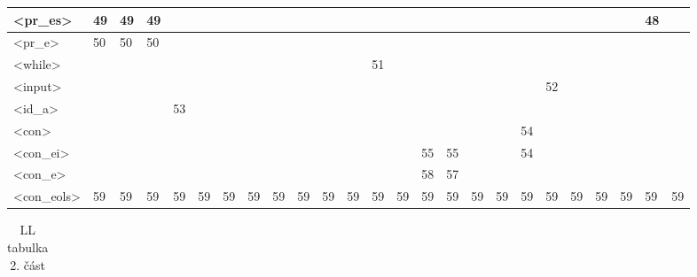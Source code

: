 \begin{normalsize}
\begin{enumerate}
\begin{landscape}
\begin{table}[htbp]
\begin{tabular}{|l|l|l|l|l|l|l|l|l|l|l|l|l|l|l|l|l|l|l|l|l|l|l|l|l|}
                    <pr\_es>&49&49&49&&&&&&&&&&&&&&&&&&&&48&
                    \\ \hline
                    <pr\_e>&50&50&50&&&&&&&&&&&&&&&&&&&&&
                    \\ \hline
                    <while>&&&&&&&&&&&&51&&&&&&&&&&&&
                    \\ \hline
                    <input>&&&&&&&&&&&&&&&&&&&52&&&&&
                    \\ \hline
                    <id\_a>&&&&53&&&&&&&&&&&&&&&&&&&&
                    \\ \hline
                    <con>&&&&&&&&&&&&&&&&&&54&&&&&&
                    \\ \hline
                    <con\_ei>&&&&&&&&&&&&&&55&55&&&54&&&&&&
                    \\ \hline
                    <con\_e>&&&&&&&&&&&&&&58&57&&&&&&&&&
                    \\ \hline
                    <con\_eols>&59&59&59&59&59&59&59&59&59&59&59&59&59&59&59&59&59&59&59&59&59&59&59&59
                    \\ \hline
                \end{tabular}
            \end{table}
        \end{landscape}
        \newpage
        \begin{landscape}
            \begin{table}[htbp]
                \label{table:prec2}
                \centering
                \caption{LL tabulka 2. část}
                \begin{tabular}{|l|l|l|l|l|l|l|l|l|l|l|l|l|l|l|l|l|l|l|l|l|l|l|l|l|l|l|l|l|l|}
                    \hline



\end{tabular}
\end{table}
\end{landscape}
\end{enumerate}
\end{normalsize}
